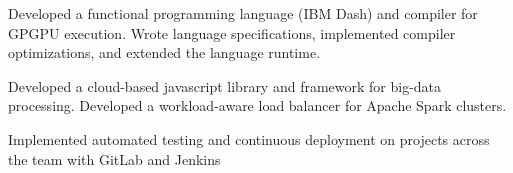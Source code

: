 \begin{cventries}
{        \begin{cvitems}
            \item Developed a functional programming language (IBM Dash) and compiler for GPGPU execution. Wrote language specifications, implemented compiler optimizations, and extended the language runtime.
            \item Developed a cloud-based javascript library and framework for big-data processing. Developed a workload-aware load balancer for Apache Spark clusters.
            \item Implemented automated testing and continuous deployment on projects across the team with GitLab and Jenkins
        \end{cvitems}
    }
\end{cventries}
